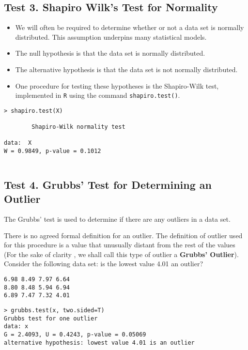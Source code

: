 \documentclass[]{article}
\begin{document}
\subsection*{Test 3. Shapiro Wilk's Test for Normality}
\begin{itemize}
\item We will often be required to determine whether or not a data set is normally distributed.
This assumption underpins many statistical models.
\item The null hypothesis is that the data set is normally distributed.
\item The alternative hypothesis is that the data set is not normally distributed.
\item One procedure for testing these hypotheses is the Shapiro-Wilk test, implemented in \texttt{R} using the command \texttt{shapiro.test()}.
\end{itemize}
\begin{framed}
\begin{verbatim}
> shapiro.test(X)

        Shapiro-Wilk normality test

data:  X
W = 0.9849, p-value = 0.1012


\end{verbatim}
\end{framed}
\subsection*{Test 4. Grubbs' Test for Determining an Outlier}

The Grubbs' test is used to determine if there are any outliers in a data set.\\ \bigskip

\noindent There is no agreed formal definition for an outlier. The definition of outlier used for this procedure is a value that unusually distant from the rest of the values (For the sake of clarity , we shall call this type of outlier a \textbf{Grubbs' Outlier}). Consider the following data set: is the lowest value 4.01 an outlier?
\begin{center}
\begin{verbatim}
6.98 8.49 7.97 6.64
8.80 8.48 5.94 6.94
6.89 7.47 7.32 4.01
\end{verbatim}
\end{center}


\begin{framed}
\begin{verbatim}
> grubbs.test(x, two.sided=T)
Grubbs test for one outlier
data: x
G = 2.4093, U = 0.4243, p-value = 0.05069
alternative hypothesis: lowest value 4.01 is an outlier
\end{verbatim}
\end{framed}
\end{document}
